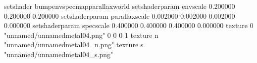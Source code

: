 setshader bumpenvspecmapparallaxworld
setshaderparam envscale 0.200000 0.200000 0.200000
setshaderparam parallaxscale 0.002000 0.002000 0.002000 0.000000
setshaderparam specscale 0.400000 0.400000 0.400000 0.000000
texture 0 "unnamed/unnamedmetal04.png" 0 0 0 1
texture n "unnamed/unnamedmetal04_n.png"
texture s "unnamed/unnamedmetal04_s.png"